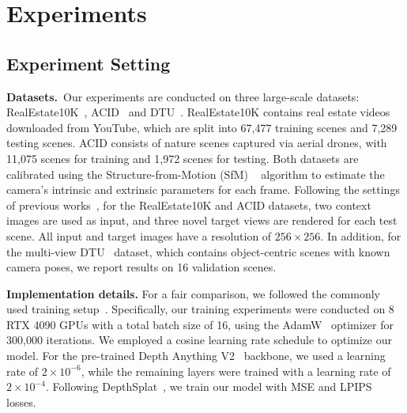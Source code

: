 




\section{Experiments}
\label{sec:Experiments}

\subsection{Experiment Setting}


\noindent \textbf{Datasets.}~Our experiments are conducted on three large-scale datasets: 
%
RealEstate10K~\citep{DBLP:journals/tog/ZhouTFFS18}, ACID~\citep{liu2021infinite} and DTU~\citep{jensen2014large}. RealEstate10K contains real estate videos downloaded from YouTube, which are split into 67,477 training scenes and 7,289 testing scenes. ACID consists of nature scenes captured via aerial drones, with 11,075 scenes for training and 1,972 scenes for testing. Both datasets are calibrated using the Structure-from-Motion (SfM) ~\cite{schonberger2016structure} algorithm to estimate the camera's intrinsic and extrinsic parameters for each frame. Following the settings of previous works~\cite{charatan2024pixelsplat, chen2024mvsplat, liu2025monosplat, xu2025depthsplat}, for the RealEstate10K and ACID datasets, two context images are used as input, and three novel target views are rendered for each test scene. All input and target images have a resolution of $256\times256$. In addition, for the multi-view DTU~\cite{jensen2014large} dataset, which contains object-centric scenes with known camera poses, we report results on 16 validation scenes.



\noindent\textbf{Implementation details.}
For a fair comparison, we followed the commonly used training setup~\cite{chen2024mvsplat, liu2025monosplat, xu2025depthsplat}. Specifically, our training experiments were conducted on 8 RTX 4090 GPUs with a total batch size of 16, using the AdamW~\citep{loshchilov2017decoupled} optimizer for 300,000 iterations. We employed a cosine learning rate schedule to optimize our model. For the pre-trained Depth Anything V2~\cite{yang2024depth} backbone, we used a learning rate of $2 \times 10^{-6}$, while the remaining layers were trained with a learning rate of $2 \times 10^{-4}$. Following DepthSplat~\cite{xu2025depthsplat}, we train our model with MSE and LPIPS losses.


